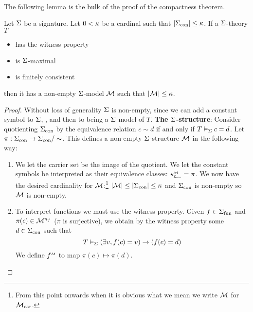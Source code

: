 The following lemma is the bulk of the proof of the compactness theorem.
\begin{lem}
    Let $\Sigma$ be a signature.
    Let $0 < \kappa$ be a cardinal such that $|{\Sigma}_\mathrm{con}| \leq \kappa$.
    If a $\Sigma$-theory $T$ 
    \begin{itemize}
        \item has the witness property
        \item is $\Sigma$-maximal
        \item is finitely consistent
    \end{itemize}
    then it has a non-empty $\Sigma$-model $\mathcal{M}$ such that $|\mathcal{M}| \leq \kappa$.
\end{lem}
\begin{proof}
    Without loss of generality $\Sigma$ is non-empty, 
    since we can add a constant symbol to $\Sigma$, 
    , and then 
     to 
    being a $\Sigma$-model of $T$.
    \textbf{The $\Sigma$-structure}: 
    Consider quotienting ${\Sigma}_\mathrm{con}$ by the equivalence relation
    $c \sim d$ if and only if $T \vDash_{\Sigma} c = d$.
    Let $\pi : {\Sigma}_\mathrm{con} \to {\Sigma}_\mathrm{con} / \sim $.
    This defines a non-empty $\Sigma$-structure $\mathcal{M}$ in the following way:
    \begin{enumerate}
        \item We let the carrier set be the image of the quotient.
        We let the constant symbols be interpreted as their equivalence classes:
        $\intp{\const{\Si}}{\MM} = \pi$.
        We now have the desired cardinality for $\mathcal{M}$:\footnote{From 
            this point onwards when it is obvious what we mean 
            we write $\mathcal{M}$ for ${\mathcal{M}}_\mathrm{car}$.} 
        $|{\mathcal{M}}| \leq |{\Sigma}_\mathrm{con}| \leq \kappa$
        and ${\Sigma}_\mathrm{con}$ is non-empty so $\mathcal{M}$ is non-empty.
        \item To interpret functions we must use the witness property.
        Given $f \in {\Sigma}_\mathrm{fun}$ and $\pi(c) \in \mathcal{M}^{n_f}$
        ($\pi$ is surjective),
        we obtain by the witness property some $d \in {\Sigma}_\mathrm{con}$
        such that \[T \vDash_{\Sigma} (\exists v, f(c) = v) \to (f(c) = d)\]
        We define $\mmintp{f}$ to map $\pi(c) \mapsto \pi(d)$.
        

\end{enumerate}
\end{proof}
